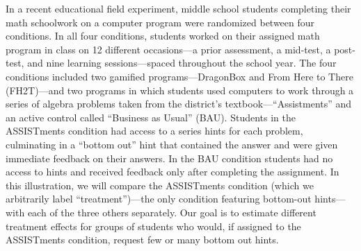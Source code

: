 \documentclass{statsoc} %
\begin{document}
In a recent educational field experiment, middle school students completing their math schoolwork on a computer program were randomized between four conditions. In all four conditions, students worked on their assigned math program in class on 12 different occasions---a prior assessment, a mid-test, a post-test, and nine learning sessions---spaced throughout the school year.  
The four conditions included two gamified programs---DragonBox and From Here to There (FH2T)---and two programs in which students used computers to work through a series of algebra problems taken from the district's textbook---``Assistments'' and an active control called ``Business as Usual'' (BAU).  %
Students in the ASSISTments condition had access to a series hints for each problem, culminating in a ``bottom out'' hint that contained the answer and were given immediate feedback on their answers. %
In the BAU condition students had no access to hints and received feedback only after completing the assignment. 
In this illustration, we will compare the ASSISTments condition (which we arbitrarily label ``treatment'')---the only condition featuring bottom-out hints---with each of the three others separately. Our goal is to estimate different treatment effects for groups of students who would, if assigned to the ASSISTments condition, request few or many bottom out hints. 
\end{document}
